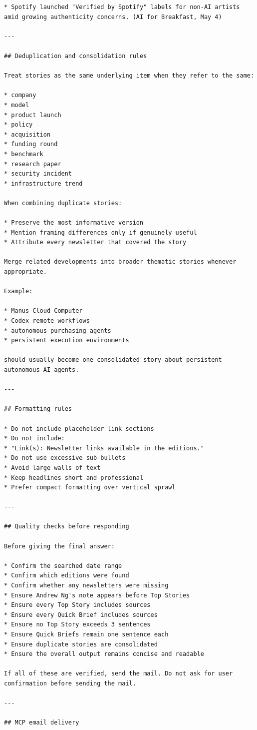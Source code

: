 \documentclass[12pt, a4paper]{article}
\begin{document}
\begin{lstlisting}[style=plainstyle]
* Spotify launched "Verified by Spotify" labels for non-AI artists amid growing authenticity concerns. (AI for Breakfast, May 4)

---

## Deduplication and consolidation rules

Treat stories as the same underlying item when they refer to the same:

* company
* model
* product launch
* policy
* acquisition
* funding round
* benchmark
* research paper
* security incident
* infrastructure trend

When combining duplicate stories:

* Preserve the most informative version
* Mention framing differences only if genuinely useful
* Attribute every newsletter that covered the story

Merge related developments into broader thematic stories whenever appropriate.

Example:

* Manus Cloud Computer
* Codex remote workflows
* autonomous purchasing agents
* persistent execution environments

should usually become one consolidated story about persistent autonomous AI agents.

---

## Formatting rules

* Do not include placeholder link sections
* Do not include:
* "Link(s): Newsletter links available in the editions."
* Do not use excessive sub-bullets
* Avoid large walls of text
* Keep headlines short and professional
* Prefer compact formatting over vertical sprawl

---

## Quality checks before responding

Before giving the final answer:

* Confirm the searched date range
* Confirm which editions were found
* Confirm whether any newsletters were missing
* Ensure Andrew Ng's note appears before Top Stories
* Ensure every Top Story includes sources
* Ensure every Quick Brief includes sources
* Ensure no Top Story exceeds 3 sentences
* Ensure Quick Briefs remain one sentence each
* Ensure duplicate stories are consolidated
* Ensure the overall output remains concise and readable

If all of these are verified, send the mail. Do not ask for user confirmation before sending the mail.

---

## MCP email delivery


\end{lstlisting}
\end{document}
